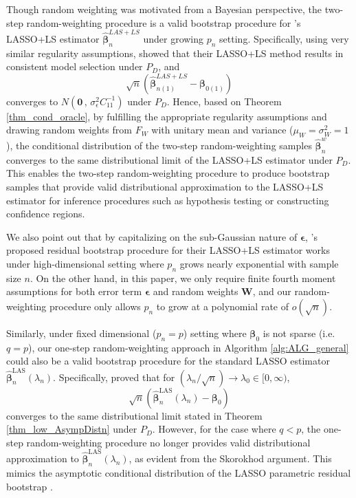 \documentclass[ejs,authoryear,linksfromyear]{imsart}
\newcommand{\bnw}{\widehat{\bm{\beta}}_n^w} %
\newcommand{\bLAS}{\widehat{\bm{\beta}}_n^{\text{LAS}}} %
\numberwithin{equation}{section}
\theoremstyle{plain}
\begin{document}
Though random weighting was motivated from a Bayesian perspective, the two-step random-weighting procedure is a valid bootstrap procedure for \citet{Liu&Yu}'s LASSO+LS estimator $\widehat{\bm{\beta}}_n^{LAS+LS}$ under growing $p_n$ setting. Specifically, using very similar regularity assumptions, \citet{Liu&Yu} showed that their LASSO+LS method results in consistent model selection under $P_D$, and 
$$
\sqrt{n} \left(
\widehat{\bm{\beta}}_{n(1)}^{LAS+LS}
- \bm{\beta}_{0(1)}
\right)
$$
converges to $N \left( \bm{0} \, , \, \sigma^2_\epsilon C_{11}^{-1} \right)$ under $P_D$.  Hence, based on Theorem \ref{thm_cond_oracle}, by fulfilling the appropriate regularity assumptions and drawing random weights from $F_W$ with unitary mean and variance ($\mu_W = \sigma^2_W = 1$), the conditional distribution of the two-step random-weighting samples $\bnw$ converges to the same distributional limit of the LASSO+LS estimator under $P_D$. This enables the two-step random-weighting procedure to produce bootstrap samples that provide valid distributional approximation to the LASSO+LS estimator for inference procedures such as hypothesis testing or constructing confidence regions.

We also point out that by capitalizing on the sub-Gaussian nature of $\bm{\epsilon}$, \citet{Liu&Yu}'s proposed residual bootstrap procedure for their LASSO+LS estimator works under high-dimensional setting where $p_n$ grows nearly exponential with sample size $n$. On the other hand, in this paper, we only require finite fourth moment assumptions for both error term $\bm{\epsilon}$ and random weights $\bm{W}$, and our random-weighting procedure only allows $p_n$ to grow at a polynomial rate of $o(\sqrt{n})$.   

Similarly, under fixed dimensional ($p_n = p$) setting where $\bm{\beta}_0$ is not sparse (i.e. $q = p$), our one-step random-weighting approach in Algorithm \ref{alg:ALG_general} could also be a valid bootstrap procedure for the standard LASSO estimator $\bLAS (\lambda_n)$. Specifically, \citet{Knight&Fu} proved that for $(\lambda_n/ \sqrt{n}) \to \lambda_0 \in [0,\infty)$, 
$$
\sqrt{n} \left(
	\bLAS(\lambda_n) - \bm{\beta}_0
\right)
$$      
converges to the same distributional limit stated in Theorem \ref{thm_low_AsympDistn} under $P_D$. However, for the case where $q < p$, the one-step random-weighting procedure no longer provides valid distributional approximation to $\bLAS (\lambda_n)$, as evident from the Skorokhod argument. This mimics the asymptotic conditional distribution of the LASSO parametric residual bootstrap \citep{Knight&Fu}.      
\end{document}
